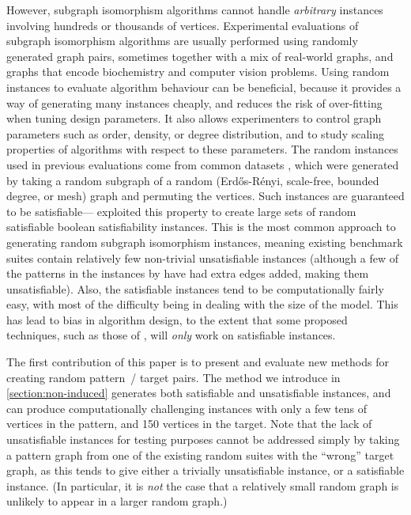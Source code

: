 \documentclass[twoside,11pt]{article}
\newcommand{\citet}[1]{\citeA{#1}}
\newcommand{\citep}[1]{\cite{#1}}
\begin{document}
However, subgraph isomorphism algorithms cannot handle \emph{arbitrary} instances involving hundreds
or thousands of vertices. Experimental evaluations of subgraph isomorphism algorithms are usually
performed using randomly generated graph pairs, sometimes together with a mix of real-world graphs,
and graphs that encode biochemistry and computer vision problems. Using random instances to evaluate
algorithm behaviour can be beneficial, because it provides a way of generating many instances
cheaply, and reduces the risk of over-fitting when tuning design parameters. It also allows
experimenters to control graph parameters such as order, density, or degree distribution, and to
study scaling properties of algorithms with respect to these parameters.  The random instances used
in previous evaluations come from common datasets
\citep{DBLP:journals/prl/SantoFSV03,DBLP:journals/constraints/ZampelliDS10}, which were generated by
taking a random subgraph of a random (Erd\H{o}s-R\'enyi, scale-free, bounded degree, or mesh) graph
and permuting the vertices. Such instances are guaranteed to be satisfiable---\citet{o:AntonO09}
exploited this property to create large sets of random satisfiable boolean satisfiability instances.
This is the most common approach to generating random subgraph isomorphism instances, meaning
existing benchmark suites contain relatively few non-trivial unsatisfiable instances (although a few
of the patterns in the instances by \citeauthor{DBLP:journals/constraints/ZampelliDS10} have had
extra edges added, making them unsatisfiable). Also, the satisfiable instances tend to be
computationally fairly easy, with most of the difficulty being in dealing with the size of the
model. This has lead to bias in algorithm design, to the extent that some proposed techniques, such
as those of \citet{DBLP:conf/sls/BattitiM07}, will \emph{only} work on satisfiable instances.

The first contribution of this paper is to present and evaluate new methods for creating random
pattern~/ target pairs.  The method we introduce in \cref{section:non-induced} generates both
satisfiable and unsatisfiable instances, and can produce computationally challenging instances with
only a few tens of vertices in the pattern, and 150 vertices in the target. Note that the lack of
unsatisfiable instances for testing purposes cannot be addressed simply by taking a pattern graph
from one of the existing random suites with the ``wrong'' target graph, as this tends to give either
a trivially unsatisfiable instance, or a satisfiable instance. (In particular, it is \emph{not} the
case that a relatively small random graph is unlikely to appear in a larger random graph.)
\end{document}
